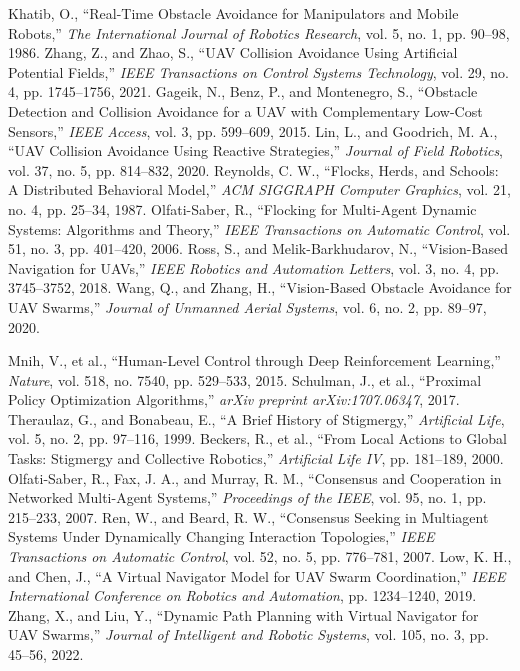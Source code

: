 \documentclass{article}
\begin{document}
\begin{thebibliography}{10}
 Khatib, O., ``Real-Time Obstacle Avoidance for Manipulators and Mobile Robots,'' \textit{The International Journal of Robotics Research}, vol. 5, no. 1, pp. 90--98, 1986.
 Zhang, Z., and Zhao, S., ``UAV Collision Avoidance Using Artificial Potential Fields,'' \textit{IEEE Transactions on Control Systems Technology}, vol. 29, no. 4, pp. 1745--1756, 2021.
 Gageik, N., Benz, P., and Montenegro, S., ``Obstacle Detection and Collision Avoidance for a UAV with Complementary Low-Cost Sensors,'' \textit{IEEE Access}, vol. 3, pp. 599--609, 2015.
 Lin, L., and Goodrich, M. A., ``UAV Collision Avoidance Using Reactive Strategies,'' \textit{Journal of Field Robotics}, vol. 37, no. 5, pp. 814--832, 2020.
 Reynolds, C. W., ``Flocks, Herds, and Schools: A Distributed Behavioral Model,'' \textit{ACM SIGGRAPH Computer Graphics}, vol. 21, no. 4, pp. 25--34, 1987.
 Olfati-Saber, R., ``Flocking for Multi-Agent Dynamic Systems: Algorithms and Theory,'' \textit{IEEE Transactions on Automatic Control}, vol. 51, no. 3, pp. 401--420, 2006.
 Ross, S., and Melik-Barkhudarov, N., ``Vision-Based Navigation for UAVs,'' \textit{IEEE Robotics and Automation Letters}, vol. 3, no. 4, pp. 3745--3752, 2018.
 Wang, Q., and Zhang, H., ``Vision-Based Obstacle Avoidance for UAV Swarms,'' \textit{Journal of Unmanned Aerial Systems}, vol. 6, no. 2, pp. 89--97, 2020.


 Mnih, V., et al., ``Human-Level Control through Deep Reinforcement Learning,'' \textit{Nature}, vol. 518, no. 7540, pp. 529--533, 2015.
 Schulman, J., et al., ``Proximal Policy Optimization Algorithms,'' \textit{arXiv preprint arXiv:1707.06347}, 2017.
 Theraulaz, G., and Bonabeau, E., ``A Brief History of Stigmergy,'' \textit{Artificial Life}, vol. 5, no. 2, pp. 97--116, 1999.
 Beckers, R., et al., ``From Local Actions to Global Tasks: Stigmergy and Collective Robotics,'' \textit{Artificial Life IV}, pp. 181--189, 2000.
 Olfati-Saber, R., Fax, J. A., and Murray, R. M., ``Consensus and Cooperation in Networked Multi-Agent Systems,'' \textit{Proceedings of the IEEE}, vol. 95, no. 1, pp. 215--233, 2007.
 Ren, W., and Beard, R. W., ``Consensus Seeking in Multiagent Systems Under Dynamically Changing Interaction Topologies,'' \textit{IEEE Transactions on Automatic Control}, vol. 52, no. 5, pp. 776--781, 2007.
 Low, K. H., and Chen, J., ``A Virtual Navigator Model for UAV Swarm Coordination,'' \textit{IEEE International Conference on Robotics and Automation}, pp. 1234--1240, 2019.
 Zhang, X., and Liu, Y., ``Dynamic Path Planning with Virtual Navigator for UAV Swarms,'' \textit{Journal of Intelligent and Robotic Systems}, vol. 105, no. 3, pp. 45--56, 2022.


\end{thebibliography}
\end{document}

